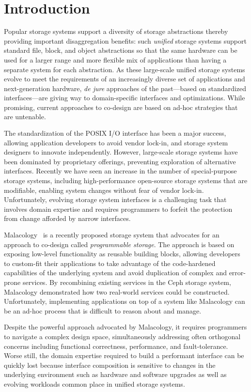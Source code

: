 \section{Introduction}
\label{sec:intro}

Popular storage systems support a diversity of storage abstractions thereby providing important disaggregation benefits: such \emph{unified} storage systems support standard file, block, and object abstractions so that the same hardware can be used for a larger range and more flexible mix of applications than having a separate  system for each abstraction. 
As these large-scale unified storage systems evolve to meet the requirements of an increasingly diverse set of applications and next-generation hardware,
\emph{de jure} approaches of the past---based on standardized interfaces---are
giving way to domain-specific interfaces and optimizations. While promising,
current approaches to co-design are based on ad-hoc strategies that are
untenable.

The standardization of the POSIX I/O interface has been a major success,
allowing application developers to avoid vendor lock-in, and storage system
designers to innovate independently.
However, large-scale storage systems have been
dominated by proprietary offerings, preventing exploration of alternative
interfaces. Recently we have seen an increase
in the number of special-purpose storage systems, including high-performance
open-source storage systems that are modifiable, enabling system changes
without fear of vendor lock-in. Unfortunately, evolving storage system
interfaces is a challenging task that involves domain expertise and requires
programmers to forfeit the protection from change afforded by narrow
interfaces.

Malacology~\cite{sevilla:eurosys17} is a recently proposed storage system that
advocates for an approach to co-design called \emph{programmable storage}. The
approach is based on exposing low-level functionality as reusable building
blocks, allowing developers to custom-fit their applications to take advantage
of the code-hardened capabilities of the underlying system and avoid
duplication of complex and error-prone services. By recombining existing
services in the Ceph storage system, Malacology demonstrated how two
real-world services could be constructed. Unfortunately, implementing
applications on top of a system like Malacology can be an ad-hoc process
that is difficult to reason about and manage.

Despite the powerful approach advocated by Malacology, it requires programmers
to navigate a complex design space, simultaneously addressing often orthogonal
concerns including functional correctness, performance, and fault-tolerance.
Worse still, the domain expertise required to build a performant interface can
be quickly lost because interface composition is sensitive to changes in the
underlying environment such as hardware and software upgrades as well as
evolving workloads common place in unified storage systems.

